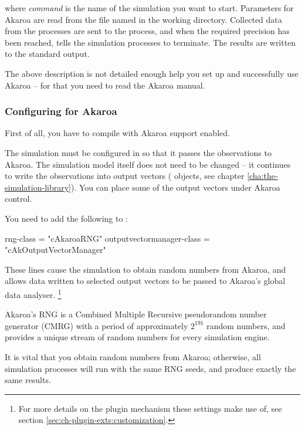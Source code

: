 where \textit{command} is the name of the simulation you want to start.
Parameters for Akaroa are read from the file named  in
the working directory. Collected data from the processes are
sent to the  process, and when the required precision
has been reached,  tells the simulation processes to
terminate. The results are written to the standard output.

The above description is not detailed enough help you
set up and successfully use Akaroa -- for that you need to read the
Akaroa manual.

\subsubsection{Configuring {\opp} for Akaroa}

First of all, you have to compile {\opp} with Akaroa support enabled.

The {\opp} simulation must be configured in 
so that it passes the observations to Akaroa. The simulation model itself does
not need to be changed -- it continues to write
the observations into output vectors ( objects,
see chapter \ref{cha:the-simulation-library}). You can place some of
the output vectors under Akaroa control.

You need to add the following to :

\begin{inifile}
[General]
rng-class = "cAkaroaRNG"
outputvectormanager-class = "cAkOutputVectorManager"
\end{inifile}

These lines cause the simulation to obtain random numbers from Akaroa,
and allows data written to selected output vectors to be passed to Akaroa's
global data analyser.
    \footnote{For more details on the plugin mechanism these settings make use of,
    see section \ref{sec:ch-plugin-exts:customization}.}

Akaroa's RNG is a Combined Multiple Recursive pseudorandom
number generator (CMRG) with a period of approximately $2^{191}$
random numbers, and provides a unique stream of random numbers
for every simulation engine.

\begin{note}
It is vital that you obtain random numbers from Akaroa; otherwise,
all simulation processes will run with the same RNG seeds, and
produce exactly the same results.
\end{note}

